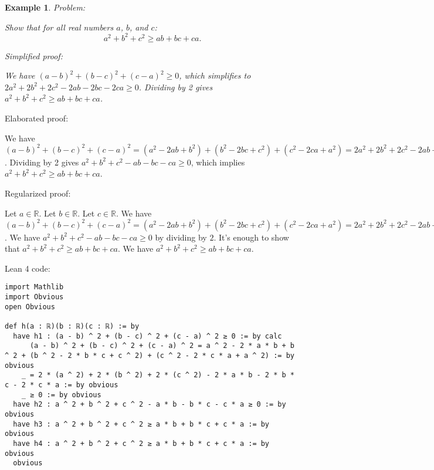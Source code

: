 \documentclass{article}
\newtheorem{example}{Example}
\begin{document}
\begin{example}
Problem:
\begin{tcolorbox}[colback=yellow!10, width=\linewidth]
Show that for all real numbers $a$, $b$, and $c$:
    $$a^2 + b^2 + c^2 \geq ab + bc + ca.$$
\end{tcolorbox}

Simplified proof:
\begin{tcolorbox}[colback=blue!10, width=\linewidth]
We have $(a-b)^2 + (b-c)^2 + (c-a)^2 \geq 0$, which simplifies to $2a^2 + 2b^2 + 2c^2 - 2ab - 2bc - 2ca \geq 0$. Dividing by 2 gives $a^2 + b^2 + c^2 \geq ab + bc + ca$.
\end{tcolorbox}
\end{example}

Elaborated proof:
\begin{tcolorbox}[colback=green!10, width=\linewidth]
We have $(a-b)^2 + (b-c)^2 + (c-a)^2 = (a^2 - 2ab + b^2) + (b^2 - 2bc + c^2) + (c^2 - 2ca + a^2) = 2a^2 + 2b^2 + 2c^2 - 2ab - 2bc - 2ca \geq 0$. Dividing by 2 gives $a^2 + b^2 + c^2 - ab - bc - ca \geq 0$, which implies $a^2 + b^2 + c^2 \geq ab + bc + ca$.
\end{tcolorbox}

Regularized proof:
\begin{tcolorbox}[colback=red!10, width=\linewidth]
Let $a\in\mathbb{R}$.
Let $b\in\mathbb{R}$.
Let $c\in\mathbb{R}$.
We have ${{(a-b)}}^2 + {{(b-c)}}^2 + {{(c-a)}}^2 = (a^2 - 2ab + b^2) + (b^2 - 2bc + c^2) + (c^2 - 2ca + a^2) = 2a^2 + 2b^2 + 2c^2 - 2ab - 2bc - 2ca \geq 0$. We have $a^2 + b^2 + c^2 - ab - bc - ca \geq 0$ by dividing by $2$.  It's enough to show that $a^2 + b^2 + c^2 \geq ab + bc + ca$. We have $a^2 + b^2 + c^2 \geq ab + bc + ca$.
\end{tcolorbox}

Lean 4 code:
\begin{tcolorbox}[colback=white!10, width=\linewidth]
\begin{lstlisting}[language=Lean4]
import Mathlib
import Obvious
open Obvious

def h(a : ℝ)(b : ℝ)(c : ℝ) := by
  have h1 : (a - b) ^ 2 + (b - c) ^ 2 + (c - a) ^ 2 ≥ 0 := by calc
      (a - b) ^ 2 + (b - c) ^ 2 + (c - a) ^ 2 = a ^ 2 - 2 * a * b + b ^ 2 + (b ^ 2 - 2 * b * c + c ^ 2) + (c ^ 2 - 2 * c * a + a ^ 2) := by obvious
    _ = 2 * (a ^ 2) + 2 * (b ^ 2) + 2 * (c ^ 2) - 2 * a * b - 2 * b * c - 2 * c * a := by obvious
    _ ≥ 0 := by obvious
  have h2 : a ^ 2 + b ^ 2 + c ^ 2 - a * b - b * c - c * a ≥ 0 := by obvious
  have h3 : a ^ 2 + b ^ 2 + c ^ 2 ≥ a * b + b * c + c * a := by obvious
  have h4 : a ^ 2 + b ^ 2 + c ^ 2 ≥ a * b + b * c + c * a := by obvious
  obvious

\end{lstlisting}
\end{tcolorbox}
\end{document}

